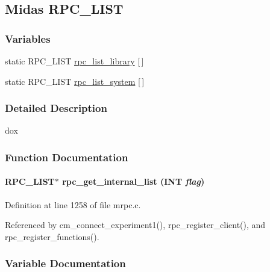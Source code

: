 \subsection{Midas RPC\_\-LIST}
\label{group__mrpcstructc}
\subsubsection*{Variables}
\begin{DoxyCompactItemize}
\item 
static RPC\_\-LIST \hyperlink{group__mrpcstructc_gac70e10137f9db5797fd787c326ade74a}{rpc\_\-list\_\-library} \mbox{[}$\,$\mbox{]}
\item 
static RPC\_\-LIST \hyperlink{group__mrpcstructc_ga3aedfec709ee3e22f1f9040dde0bd75b}{rpc\_\-list\_\-system} \mbox{[}$\,$\mbox{]}
\end{DoxyCompactItemize}


\subsubsection{Detailed Description}
dox 

\subsubsection{Function Documentation}
\paragraph[{rpc\_\-get\_\-internal\_\-list}]{\setlength{\rightskip}{0pt plus 5cm}RPC\_\-LIST$\ast$ rpc\_\-get\_\-internal\_\-list ({\bf INT} {\em flag})}\hfill\label{group__mrpcstructc_gab47874f46099263ae71d008956e52610}


Definition at line 1258 of file mrpc.c.

Referenced by cm\_\-connect\_\-experiment1(), rpc\_\-register\_\-client(), and rpc\_\-register\_\-functions().

\subsubsection{Variable Documentation}
